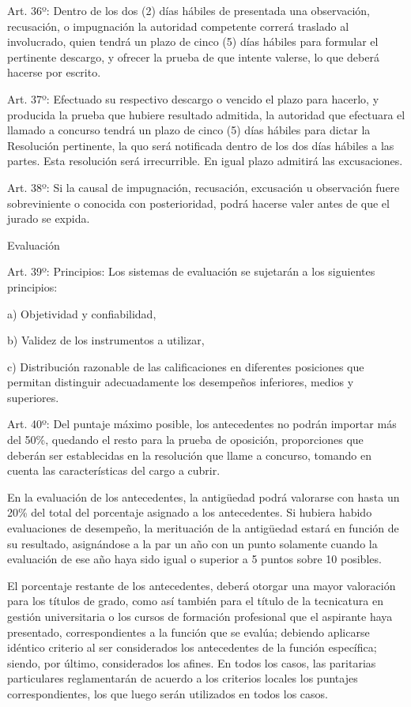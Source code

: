 \documentclass[]{article}
\begin{document}
Art. 36º: Dentro de los dos (2) días hábiles de presentada una
observación, recusación, o impugnación la autoridad competente correrá
traslado al involucrado, quien tendrá un plazo de cinco (5) días hábiles
para formular el pertinente descargo, y ofrecer la prueba de que intente
valerse, lo que deberá hacerse por escrito.

Art. 37º: Efectuado su respectivo descargo o vencido el plazo para
hacerlo, y producida la prueba que hubiere resultado admitida, la
autoridad que efectuara el llamado a concurso tendrá un plazo de cinco
(5) días hábiles para dictar la Resolución pertinente, la quo será
notificada dentro de los dos días hábiles a las partes. Esta resolución
será irrecurrible. En igual plazo admitirá las excusaciones.

Art. 38º: Si la causal de impugnación, recusación, excusación u
observación fuere sobreviniente o conocida con posterioridad, podrá
hacerse valer antes de que el jurado se expida.

Evaluación

Art. 39º: Principios: Los sistemas de evaluación se sujetarán a los
siguientes principios:

a) Objetividad y confiabilidad,

b) Validez de los instrumentos a utilizar,

c) Distribución razonable de las calificaciones en diferentes posiciones
que permitan distinguir adecuadamente los desempeños inferiores, medios
y superiores.

Art. 40º: Del puntaje máximo posible, los antecedentes no podrán
importar más del 50\%, quedando el resto para la prueba de oposición,
proporciones que deberán ser establecidas en la resolución que llame a
concurso, tomando en cuenta las características del cargo a cubrir.

En la evaluación de los antecedentes, la antigüedad podrá valorarse con
hasta un 20\% del total del porcentaje asignado a los antecedentes. Si
hubiera habido evaluaciones de desempeño, la merituación de la
antigüedad estará en función de su resultado, asignándose a la par un
año con un punto solamente cuando la evaluación de ese año haya sido
igual o superior a 5 puntos sobre 10 posibles.

El porcentaje restante de los antecedentes, deberá otorgar una mayor
valoración para los títulos de grado, como así también para el título de
la tecnicatura en gestión universitaria o los cursos de formación
profesional que el aspirante haya presentado, correspondientes a la
función que se evalúa; debiendo aplicarse idéntico criterio al ser
considerados los antecedentes de la función específica; siendo, por
último, considerados los afines. En todos los casos, las paritarias
particulares reglamentarán de acuerdo a los criterios locales los
puntajes correspondientes, los que luego serán utilizados en todos los
casos.
\end{document}
